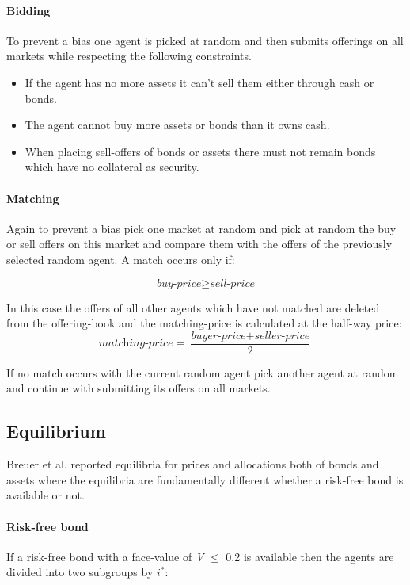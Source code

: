 \documentclass[../Bachelorarbeit.tex]{subfiles}
\begin{document}
\paragraph{Bidding}
To prevent a bias one agent is picked at random and then submits offerings on all markets while respecting the following constraints.

\begin{itemize}
\item If the agent has no more assets it can't sell them either through cash or bonds.
\item The agent cannot buy more assets or bonds than it owns cash.
\item When placing sell-offers of bonds or assets there must not remain bonds which have no collateral as security. 
\end{itemize}

\paragraph{Matching}
Again to prevent a bias pick one market at random and pick at random the buy or sell offers on this market and compare them with the offers of the previously selected random agent. A match occurs only if:

\begin{equation}
\textit{buy-price} \geq \textit{sell-price}
\end{equation}

In this case the offers of all other agents which have not matched are deleted from the offering-book and the matching-price is calculated at the half-way price:
\begin{equation}
\textit{matching-price} = \frac{\textit{buyer-price} + \textit{seller-price}}{2}
\end{equation}

If no match occurs with the current random agent pick another agent at random and continue with submitting its offers on all markets.

\subsection{Equilibrium}
\label{sec:EQUILIBRIUM}
Breuer et al. reported equilibria for prices and allocations both of bonds and assets where the equilibria are fundamentally different whether a risk-free bond is available or not.

\paragraph{Risk-free bond}
If a risk-free bond with a face-value of \textit{V} $\leq$ 0.2 is available then the agents are divided into two subgroups by $i^*$:
\end{document}
